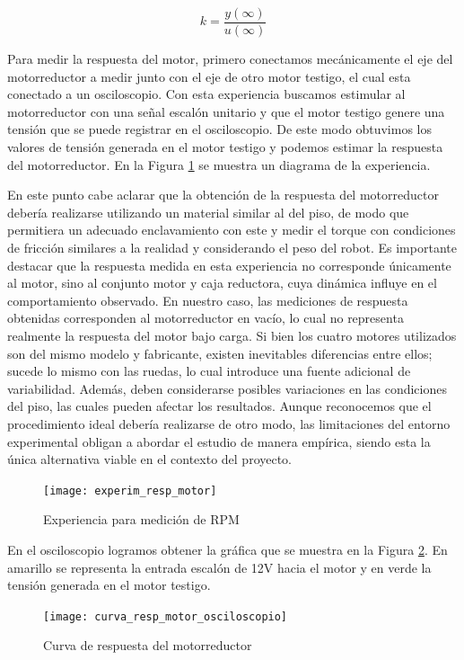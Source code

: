 $$ k=\frac{y(\infty)}{u(\infty)} $$

Para medir la respuesta del motor, primero conectamos mecánicamente el eje del motorreductor a medir junto con el eje de otro motor testigo, el cual esta conectado a un osciloscopio. Con esta experiencia buscamos estimular al motorreductor con una señal escalón unitario y que el motor testigo genere una tensión que se puede registrar en el osciloscopio. De este modo obtuvimos los valores de tensión generada en el motor testigo y podemos estimar la respuesta del motorreductor. En la Figura \ref{fig:exprespmotor} se muestra un diagrama de la experiencia.

En este punto cabe aclarar que la obtención de la respuesta del motorreductor debería realizarse utilizando un material similar al del piso, de modo que permitiera un adecuado enclavamiento con este y medir el torque con condiciones de fricción similares a la realidad y considerando el peso del robot. Es importante destacar que la respuesta medida en esta experiencia no corresponde únicamente al motor, sino al conjunto motor y caja reductora, cuya dinámica influye en el comportamiento observado. En nuestro caso, las mediciones de respuesta obtenidas corresponden al motorreductor en vacío, lo cual no representa realmente la respuesta del motor bajo carga.
Si bien los cuatro motores utilizados son del mismo modelo y fabricante, existen inevitables diferencias entre ellos; sucede lo mismo con las ruedas, lo cual introduce una fuente adicional de variabilidad. Además, deben considerarse posibles variaciones en las condiciones del piso, las cuales pueden afectar los resultados. Aunque reconocemos que el procedimiento ideal debería realizarse de otro modo, las limitaciones del entorno experimental obligan a abordar el estudio de manera empírica, siendo esta la única alternativa viable en el contexto del proyecto.

\begin{figure}[H]
    \centering
    \texttt{[image: experim\_resp\_motor]}
    \caption{Experiencia para medición de RPM}
    \label{fig:exprespmotor}
\end{figure}

En el osciloscopio logramos obtener la gráfica que se muestra en la Figura \ref{fig:curvarespmotor}. En amarillo se representa la entrada escalón de 12V hacia el motor y en verde la tensión generada en el motor testigo.

\begin{figure}[H]
    \centering
    \texttt{[image: curva\_resp\_motor\_osciloscopio]}
    \caption{Curva de respuesta del motorreductor}
    \label{fig:curvarespmotor}
\end{figure}

